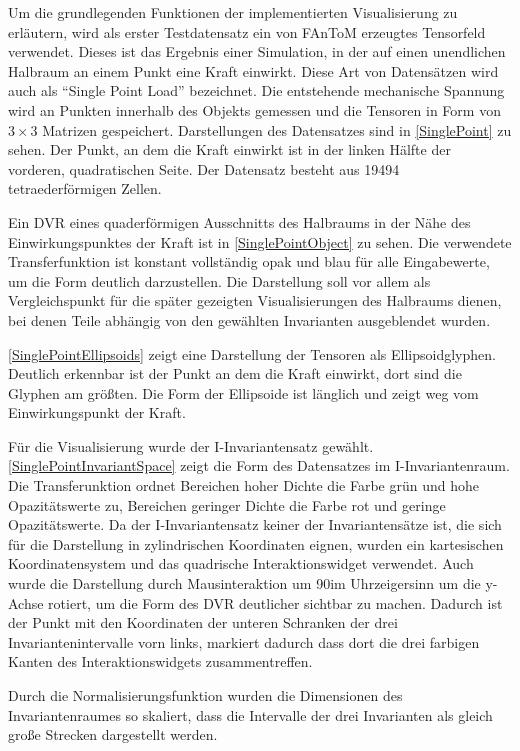 \documentclass[a4paper,fontsize=12pt,toc=bib,halfparskip,ngerman]{scrartcl}
\begin{document}
Um die grundlegenden Funktionen der implementierten Visualisierung zu erl\"autern, wird als erster Testdatensatz ein von FAnToM erzeugtes Tensorfeld verwendet. Dieses ist das Ergebnis einer Simulation, in der auf einen unendlichen Halbraum an einem Punkt eine Kraft einwirkt. Diese Art von Datens\"atzen wird auch als ``Single Point Load'' bezeichnet. Die entstehende mechanische Spannung wird an Punkten innerhalb des Objekts gemessen und die Tensoren in Form von $3\times3$ Matrizen gespeichert. Darstellungen des Datensatzes sind in \cref{SinglePoint} zu sehen. Der Punkt, an dem die Kraft einwirkt ist in der linken H\"alfte der vorderen, quadratischen Seite. Der Datensatz besteht aus 19494 tetraederf\"ormigen Zellen.

Ein DVR eines quaderf\"ormigen Ausschnitts des Halbraums in der N\"ahe des Einwirkungspunktes der Kraft ist in \cref{SinglePointObject} zu sehen. Die verwendete Transferfunktion ist konstant vollst\"andig opak und blau f\"ur alle Eingabewerte, um die Form deutlich darzustellen. Die Darstellung soll vor allem als Vergleichspunkt f\"ur die sp\"ater gezeigten Visualisierungen des Halbraums dienen, bei denen Teile abh\"angig von den gew\"ahlten Invarianten ausgeblendet wurden.

\cref{SinglePointEllipsoids} zeigt eine Darstellung der Tensoren als Ellipsoidglyphen. Deutlich erkennbar ist der Punkt an dem die Kraft einwirkt, dort sind die Glyphen am gr\"o{\ss}ten. Die Form der Ellipsoide ist l\"anglich und zeigt weg vom Einwirkungspunkt der Kraft.

F\"ur die Visualisierung wurde der I-Invariantensatz gew\"ahlt. \cref{SinglePointInvariantSpace} zeigt die Form des Datensatzes im I-Invariantenraum. Die Transferunktion ordnet Bereichen hoher Dichte die Farbe gr\"un und hohe Opazit\"atswerte zu, Bereichen geringer Dichte die Farbe rot und geringe Opazit\"atswerte. Da der I-Invariantensatz keiner der Invariantens\"atze ist, die sich f\"ur die Darstellung in zylindrischen Koordinaten eignen, wurden ein kartesischen Koordinatensystem und das quadrische Interaktionswidget verwendet. Auch wurde die Darstellung durch Mausinteraktion um 90\textdegree im Uhrzeigersinn um die y-Achse rotiert, um die Form des DVR deutlicher sichtbar zu machen. Dadurch ist der Punkt mit den Koordinaten der unteren Schranken der drei Invariantenintervalle vorn links, markiert dadurch dass dort die drei farbigen Kanten des Interaktionswidgets zusammentreffen.

Durch die Normalisierungsfunktion wurden die Dimensionen des Invariantenraumes so skaliert, dass die Intervalle der drei Invarianten als gleich gro{\ss}e Strecken dargestellt werden.
\end{document}

